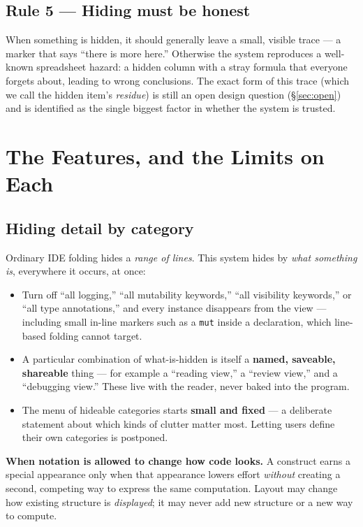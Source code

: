 \documentclass[11pt]{article}
\newcommand{\req}[1]{\textbf{\color{accent}#1}}
\newcommand{\term}[1]{\emph{#1}}
\begin{document}
\subsection{Rule 5 --- Hiding must be honest}
When something is hidden, it should generally leave a small, visible trace --- a marker that says ``there is more here.'' Otherwise the system reproduces a well-known spreadsheet hazard: a hidden column with a stray formula that everyone forgets about, leading to wrong conclusions. The exact form of this trace (which we call the hidden item's \term{residue}) is still an open design question (\S\ref{sec:open}) and is identified as the single biggest factor in whether the system is trusted.

\section{The Features, and the Limits on Each}

\subsection{Hiding detail by category}
Ordinary IDE folding hides a \emph{range of lines}. This system hides by \emph{what something is}, everywhere it occurs, at once:
\begin{itemize}[leftmargin=1.4em,itemsep=3pt]
  \item Turn off ``all logging,'' ``all mutability keywords,'' ``all visibility keywords,'' or ``all type annotations,'' and every instance disappears from the view --- including small in-line markers such as a \texttt{mut} inside a declaration, which line-based folding cannot target.
  \item A particular combination of what-is-hidden is itself a \req{named, saveable, shareable} thing --- for example a ``reading view,'' a ``review view,'' and a ``debugging view.'' These live with the reader, never baked into the program.
  \item The menu of hideable categories starts \req{small and fixed} --- a deliberate statement about which kinds of clutter matter most. Letting users define their own categories is postponed.
\end{itemize}

\begin{principle}
\textbf{When notation is allowed to change how code looks.} A construct earns a special appearance only when that appearance lowers effort \emph{without} creating a second, competing way to express the same computation. Layout may change how existing structure is \emph{displayed}; it may never add new structure or a new way to compute.
\end{principle}
\end{document}
